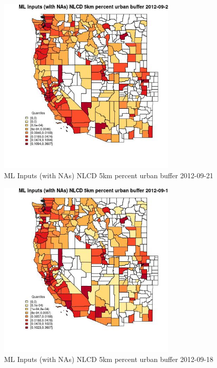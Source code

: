\clearpage 

\begin{figure} 
\centering  
\includegraphics[width=0.77\textwidth]{Code_Outputs/Report_ML_input_PM25_Step4_part_e_de_duplicated_aves_compiled_2019-05-14wNAs_CountyNLCD_5km_percent_urban_bufferMean2012-09-21_2012-09-21.jpg} 
\caption{\label{fig:Report_ML_input_PM25_Step4_part_e_de_duplicated_aves_compiled_2019-05-14wNAsCountyNLCD_5km_percent_urban_bufferMean2012-09-21_2012-09-21}ML Inputs (with NAs) NLCD 5km percent urban buffer 2012-09-21} 
\end{figure} 
 

\begin{figure} 
\centering  
\includegraphics[width=0.77\textwidth]{Code_Outputs/Report_ML_input_PM25_Step4_part_e_de_duplicated_aves_compiled_2019-05-14wNAs_CountyNLCD_5km_percent_urban_bufferMean2012-09-18_2012-09-18.jpg} 
\caption{\label{fig:Report_ML_input_PM25_Step4_part_e_de_duplicated_aves_compiled_2019-05-14wNAsCountyNLCD_5km_percent_urban_bufferMean2012-09-18_2012-09-18}ML Inputs (with NAs) NLCD 5km percent urban buffer 2012-09-18} 
\end{figure} 
 


